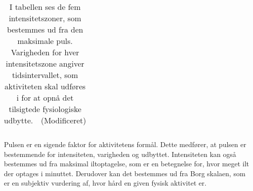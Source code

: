 \begin{table}[H]
\begin{tabular}{cccc}
	\end{tabular}
	\caption{I tabellen ses de fem intensitetszoner, som bestemmes ud fra den maksimale puls. Varigheden for hver intensitetszone angiver tidsintervallet, som aktiviteten skal udføres i for at opnå det tilsigtede fysiologiske udbytte.~\citep{Heartratejournal2015}~(Modificeret)}
	\label{tab:PA_Procentpuls}
\end{table} \vspace{-0.25cm}
Pulsen er en sigende faktor for aktivitetens formål. Dette medfører, at pulsen er bestemmende for intensiteten, varigheden og udbyttet. Intensiteten kan også bestemmes ud fra maksimal iltoptagelse, som er en betegnelse for, hvor meget ilt der optages i minuttet. Derudover kan det bestemmes ud fra Borg skalaen, som er en subjektiv vurdering af, hvor hård en given fysisk aktivitet er.~\citep{Kiens2007}